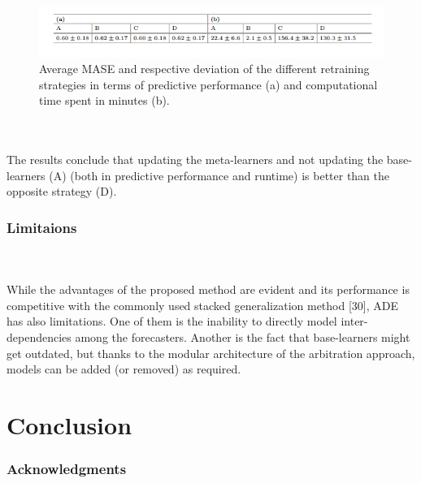 \documentclass[runningheads,a4paper]{llncs}[2015/06/24]
\begin{document}
\begin{figure}[h]
\centering
\includegraphics[width=\textwidth]{trainingStrategies}
\caption{ Average MASE and respective deviation of the different retraining strategies in terms of predictive performance (a) and computational time spent in minutes (b).}
\label{fig:training Strategies}
\end{figure}

\hspace{1cm}\\\\
The results conclude that updating the meta-learners and not updating the base-learners (A) (both in predictive performance and runtime) is better than the opposite strategy (D).

\subsubsection{Limitaions}
\hspace{1cm}\\\\ While the advantages of the proposed method are evident and its performance is competitive with the commonly used stacked generalization method [30], ADE has also limitations. One of them is the inability to directly model inter-dependencies among the forecasters. Another is the fact that base-learners might get outdated, but thanks to the modular architecture of the arbitration approach, models can be added (or removed) as required.

\section{Conclusion}

\subsubsection{Acknowledgments}




\end{document}
